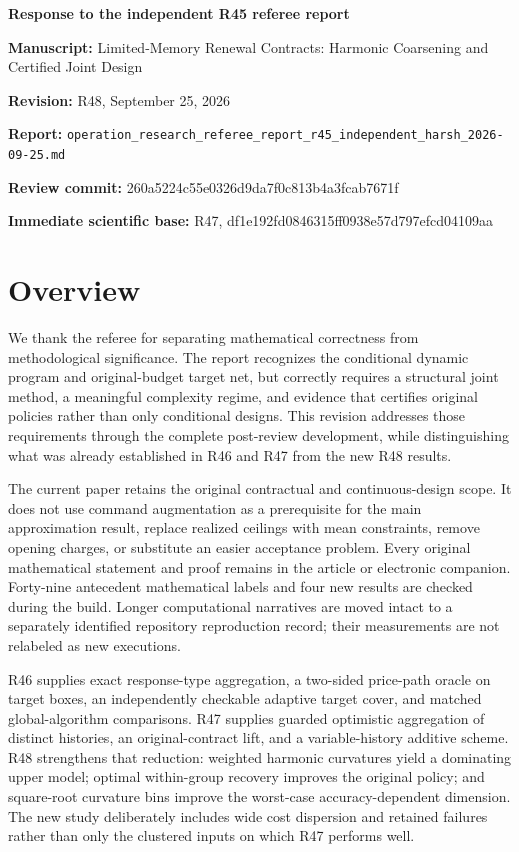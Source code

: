 \documentclass[11pt,letterpaper]{article}
\begin{document}
\begin{center}\Large\bfseries Response to the independent R45 referee report\end{center}


\textbf{Manuscript:} Limited-Memory Renewal Contracts: Harmonic Coarsening and Certified Joint Design

\textbf{Revision:} R48, September 25, 2026

\textbf{Report:} \nolinkurl{operation_research_referee_report_r45_independent_harsh_2026-09-25.md}

\textbf{Review commit:} 260a5224c55e0326d9da7f0c813b4a3fcab7671f

\textbf{Immediate scientific base:} R47, df1e192fd0846315ff0938e57d797efcd04109aa



\section*{Overview}


We thank the referee for separating mathematical correctness from methodological significance. The report recognizes the conditional dynamic program and original-budget target net, but correctly requires a structural joint method, a meaningful complexity regime, and evidence that certifies original policies rather than only conditional designs. This revision addresses those requirements through the complete post-review development, while distinguishing what was already established in R46 and R47 from the new R48 results.



The current paper retains the original contractual and continuous-design scope. It does not use command augmentation as a prerequisite for the main approximation result, replace realized ceilings with mean constraints, remove opening charges, or substitute an easier acceptance problem. Every original mathematical statement and proof remains in the article or electronic companion. Forty-nine antecedent mathematical labels and four new results are checked during the build. Longer computational narratives are moved intact to a separately identified repository reproduction record; their measurements are not relabeled as new executions.



R46 supplies exact response-type aggregation, a two-sided price-path oracle on target boxes, an independently checkable adaptive target cover, and matched global-algorithm comparisons. R47 supplies guarded optimistic aggregation of distinct histories, an original-contract lift, and a variable-history additive scheme. R48 strengthens that reduction: weighted harmonic curvatures yield a dominating upper model; optimal within-group recovery improves the original policy; and square-root curvature bins improve the worst-case accuracy-dependent dimension. The new study deliberately includes wide cost dispersion and retained failures rather than only the clustered inputs on which R47 performs well.
\end{document}
